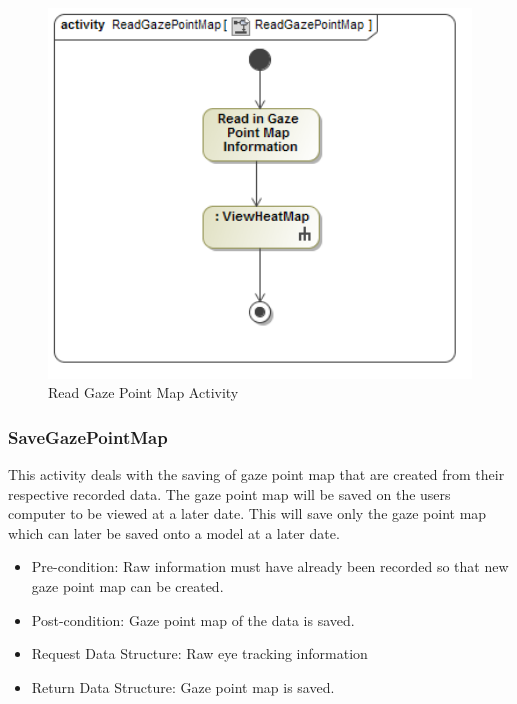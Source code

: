 	\begin{figure}[!ht]
		\centering
		\includegraphics[scale=0.5,width=15cm,keepaspectratio]{Diagrams/Activity_Diagram__ReadGazePointMap__ReadGazePointMap.png}
		\caption{Read Gaze Point Map Activity}
	\end{figure}
	
	\subsubsection{SaveGazePointMap}
	This activity deals with the saving of gaze point map that are created from their respective recorded data. The gaze point map will be saved on the users computer to be viewed at a later date. This will save only the gaze point map which can later be saved onto a model at a later date.
	\begin{itemize}
		\item Pre-condition: Raw information must have already been recorded so that new gaze point map can be created.
		\item Post-condition: Gaze point map of the data is saved.
		\item Request Data Structure: Raw eye tracking information
		\item Return Data Structure: Gaze point map is saved.
	\end{itemize}
	
